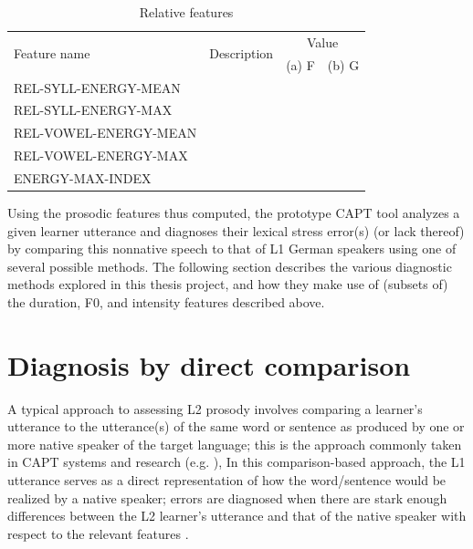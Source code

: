\begin{table}[h!]
	\begin{subtable}[h]{\textwidth}
	\caption{Relative features}
	\begin{tabularx}{\textwidth}{p{}Xrr}
	\toprule
	\multirow{2}{*}{Feature name} 
					& \multirow{2}{*}{Description}
										& \multicolumn{2}{c}{Value} \\	
				  	&							&  (a) F		& (b) G			\\
	\midrule
	
REL-SYLL-ENERGY-MEAN & \color{red}{TD} &  \color{red}{TD}	& \color{red}{TD}\\
REL-SYLL-ENERGY-MAX & \color{red}{TD} &  \color{red}{TD}	& \color{red}{TD}\\
REL-VOWEL-ENERGY-MEAN & \color{red}{TD} &  \color{red}{TD}	& \color{red}{TD}\\
REL-VOWEL-ENERGY-MAX & \color{red}{TD} &  \color{red}{TD}	& \color{red}{TD}\\
ENERGY-MAX-INDEX & \color{red}{TD} &  \color{red}{TD}	& \color{red}{TD}\\
	
	\bottomrule
	\end{tabularx}
	\end{subtable}
\label{tab:intfeatures}
\end{table}
	
	
\vspace{2em}
	
Using the prosodic features thus computed, the prototype CAPT tool analyzes a given learner utterance and diagnoses their lexical stress error(s) (or lack thereof) by comparing this nonnative speech to that of L1 German speakers using one of several possible methods. The following section describes the various diagnostic methods explored in this thesis project, and how they make use of (subsets of) the duration, F0, and intensity features described above. 
	
	
\section{Diagnosis by direct comparison}
\label{sec:diag:compare}


A typical approach to assessing L2 prosody involves comparing a learner's utterance to the utterance(s) of the same word or sentence as produced by one or more native speaker of the target language; this is the approach commonly taken in CAPT systems and research
(e.g. ),  %
In this comparison-based approach, the L1 utterance serves as a direct representation of how the word/sentence would be realized by a native speaker; errors are diagnosed when there are stark enough differences between the L2 learner's utterance and that of the native speaker with respect to the relevant features .

